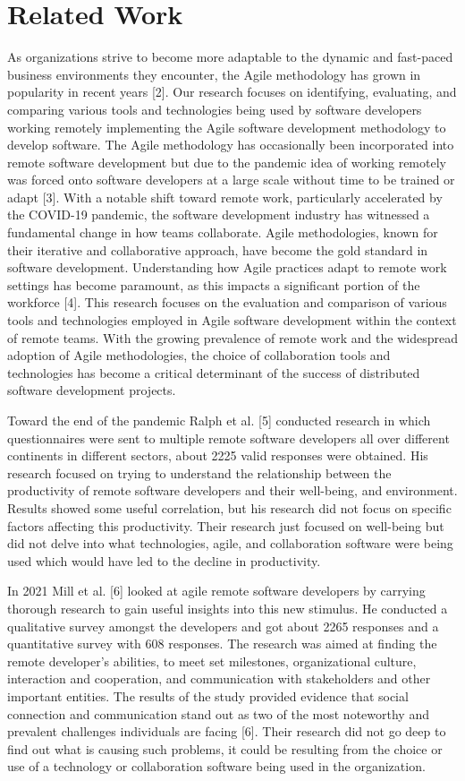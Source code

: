 \documentclass[conference]{IEEEtran}
\begin{document}
\section{Related Work}
As organizations strive to become more adaptable to the dynamic and fast-paced business environments they encounter, the Agile methodology has grown in popularity in recent years [2]. Our research focuses on identifying, evaluating, and comparing various tools and technologies being used by software developers working remotely implementing the Agile software development methodology to develop software. The Agile methodology has occasionally been incorporated into remote software development but due to the pandemic idea of working remotely was forced onto software developers at a large scale without time to be trained or adapt [3]. With a notable shift toward remote work, particularly accelerated by the COVID-19 pandemic, the software development industry has witnessed a fundamental change in how teams collaborate. Agile methodologies, known for their iterative and collaborative approach, have become the gold standard in software development. Understanding how Agile practices adapt to remote work settings has become paramount, as this impacts a significant portion of the workforce [4]. This research focuses on the evaluation and comparison of various tools and technologies employed in Agile software development within the context of remote teams. With the growing prevalence of remote work and the widespread adoption of Agile methodologies, the choice of collaboration tools and technologies has become a critical determinant of the success of distributed software development projects.

Toward the end of the pandemic Ralph et al. [5] conducted research in which questionnaires were sent to multiple remote software developers all over different continents in different sectors, about 2225 valid responses were obtained. His research focused on trying to understand the relationship between the productivity of remote software developers and their well-being, and environment. Results showed some useful correlation, but his research did not focus on specific factors affecting this productivity. Their research just focused on well-being but did not delve into what technologies, agile, and collaboration software were being used which would have led to the decline in productivity. 

In 2021 Mill et al. [6] looked at agile remote software developers by carrying thorough research to gain useful insights into this new stimulus. He conducted a qualitative survey amongst the developers and got about 2265 responses and a quantitative survey with 608 responses. The research was aimed at finding the remote developer’s abilities, to meet set milestones, organizational culture, interaction and cooperation, and communication with stakeholders and other important entities. The results of the study provided evidence that social connection and communication stand out as two of the most noteworthy and prevalent challenges individuals are facing [6]. Their research did not go deep to find out what is causing such problems, it could be resulting from the choice or use of a technology or collaboration software being used in the organization. 
\end{document}
